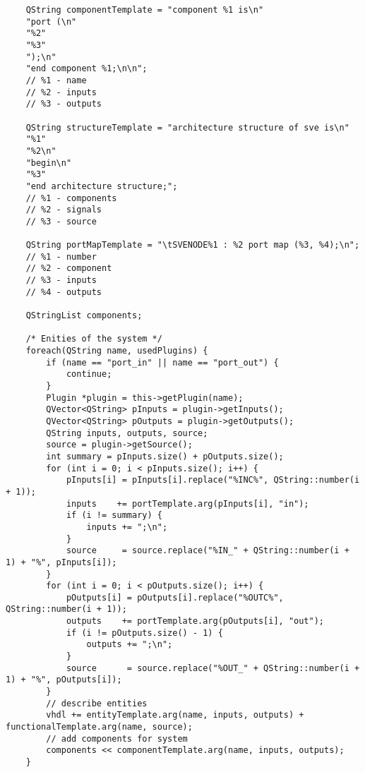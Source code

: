\begin{lstlisting}
    QString componentTemplate = "component %1 is\n"
    "port (\n"
    "%2"
    "%3"
    ");\n"
    "end component %1;\n\n";
    // %1 - name
    // %2 - inputs
    // %3 - outputs

    QString structureTemplate = "architecture structure of sve is\n"
    "%1"
    "%2\n"
    "begin\n"
    "%3"
    "end architecture structure;";
    // %1 - components
    // %2 - signals
    // %3 - source

    QString portMapTemplate = "\tSVENODE%1 : %2 port map (%3, %4);\n";
    // %1 - number
    // %2 - component
    // %3 - inputs
    // %4 - outputs

    QStringList components;

    /* Enities of the system */
    foreach(QString name, usedPlugins) {
        if (name == "port_in" || name == "port_out") {
            continue;
        }
        Plugin *plugin = this->getPlugin(name);
        QVector<QString> pInputs = plugin->getInputs();
        QVector<QString> pOutputs = plugin->getOutputs();
        QString inputs, outputs, source;
        source = plugin->getSource();
        int summary = pInputs.size() + pOutputs.size();
        for (int i = 0; i < pInputs.size(); i++) {
            pInputs[i] = pInputs[i].replace("%INC%", QString::number(i + 1));
            inputs    += portTemplate.arg(pInputs[i], "in");
            if (i != summary) {
                inputs += ";\n";
            }
            source     = source.replace("%IN_" + QString::number(i + 1) + "%", pInputs[i]);
        }
        for (int i = 0; i < pOutputs.size(); i++) {
            pOutputs[i] = pOutputs[i].replace("%OUTC%", QString::number(i + 1));
            outputs    += portTemplate.arg(pOutputs[i], "out");
            if (i != pOutputs.size() - 1) {
                outputs += ";\n";
            }
            source      = source.replace("%OUT_" + QString::number(i + 1) + "%", pOutputs[i]);
        }
        // describe entities
        vhdl += entityTemplate.arg(name, inputs, outputs) + functionalTemplate.arg(name, source);
        // add components for system
        components << componentTemplate.arg(name, inputs, outputs);
    }


\end{lstlisting}
